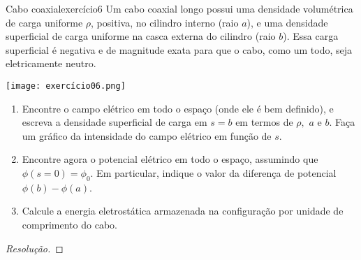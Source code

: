 \begin{exercício}{Cabo coaxial}{exercício6}
    Um cabo coaxial longo possui uma densidade volumétrica de carga uniforme \(\rho\), positiva, no cilindro interno (raio \(a\)), e uma densidade superficial de carga uniforme na casca externa do cilindro (raio \(b\)). Essa carga superficial é negativa e de magnitude exata para que o cabo, como um todo, seja eletricamente neutro.
    \begin{center}
        \texttt{[image: exercício06.png]}
    \end{center}
    \begin{enumerate}[label=(\alph*)]
        \item Encontre o campo elétrico em todo o espaço (onde ele é bem definido), e escreva a densidade superficial de carga em \(s = b\) em termos de \(\rho,\) \(a\) e \(b\). Faça um gráfico da intensidade do campo elétrico em função de \(s\).
        \item Encontre agora o potencial elétrico em todo o espaço, assumindo que \(\phi(s = 0) = \phi_0\). Em particular, indique o valor da diferença de potencial \(\phi(b) - \phi(a)\).
        \item Calcule a energia eletrostática armazenada na configuração por unidade de comprimento do cabo.
\end{enumerate}
\end{exercício}
\begin{proof}[Resolução]

\end{proof}

